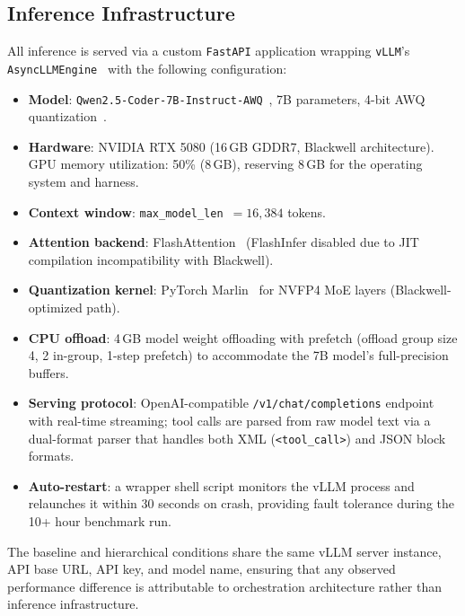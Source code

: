 \subsection{Inference Infrastructure}
\label{sec:arch:infra}

All inference is served via a custom \texttt{FastAPI} application wrapping
\texttt{vLLM}'s \texttt{AsyncLLMEngine}~\cite{kwon2023vllm} with the
following configuration:

\begin{itemize}
  \item \textbf{Model}: \texttt{Qwen2.5-Coder-7B-Instruct-AWQ}~\cite{qwen25coder2024},
    7B parameters, 4-bit AWQ quantization~\cite{lin2024awq}.
  \item \textbf{Hardware}: NVIDIA RTX 5080 (16\,GB GDDR7, Blackwell
    architecture). GPU memory utilization: 50\% (8\,GB), reserving 8\,GB
    for the operating system and harness.
  \item \textbf{Context window}: \texttt{max\_model\_len}~$= 16{,}384$ tokens.
  \item \textbf{Attention backend}: FlashAttention~\cite{dao2022flashattention}
    (FlashInfer disabled due to JIT compilation incompatibility with Blackwell).
  \item \textbf{Quantization kernel}: PyTorch Marlin~\cite{frantar2024marlin}
    for NVFP4 MoE layers (Blackwell-optimized path).
  \item \textbf{CPU offload}: 4\,GB model weight offloading with prefetch
    (offload group size 4, 2 in-group, 1-step prefetch) to accommodate the
    7B model's full-precision buffers.
  \item \textbf{Serving protocol}: OpenAI-compatible \texttt{/v1/chat/completions}
    endpoint with real-time streaming; tool calls are parsed from raw model
    text via a dual-format parser that handles both XML
    (\texttt{<tool\_call>}) and JSON block formats.
  \item \textbf{Auto-restart}: a wrapper shell script monitors the vLLM
    process and relaunches it within 30 seconds on crash, providing
    fault tolerance during the 10+ hour benchmark run.
\end{itemize}

\noindent The baseline and hierarchical conditions share the same vLLM
server instance, API base URL, API key, and model name, ensuring that any
observed performance difference is attributable to orchestration architecture
rather than inference infrastructure.
